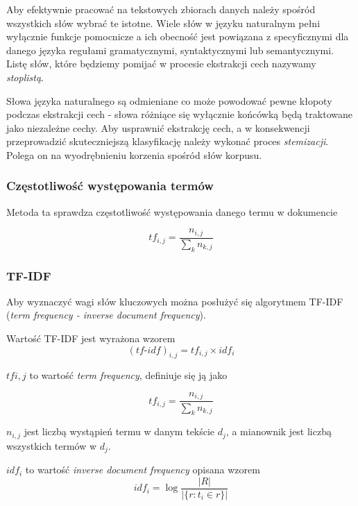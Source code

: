 \documentclass{classrep}
\begin{document}
Aby efektywnie pracować na tekstowych zbiorach danych należy spośród wszystkich słów wybrać te
istotne. Wiele słów w języku naturalnym pełni wyłącznie funkcje pomocnicze a ich obecność
jest powiązana z specyficznymi dla danego języka regułami gramatycznymi, syntaktycznymi
lub semantycznymi. Listę słów, które będziemy pomijać w procesie ekstrakcji cech
nazywamy \textit{stoplistą}.


Słowa języka naturalnego są odmieniane co może powodować pewne kłopoty podczas ekstrakcji
cech - słowa różniące się wyłącznie końcówką będą traktowane jako niezależne cechy. Aby
usprawnić ekstrakcję cech, a w konsekwencji przeprowadzić skuteczniejszą klasyfikację
należy wykonać proces \textit{stemizacji}. Polega on na wyodrębnieniu korzenia spośród
słów korpusu.

\subsubsection{Częstotliwość występowania termów}
Metoda ta sprawdza częstotliwość występowania danego termu w dokumencie

\begin{equation}
  tf_{i,j} = \frac{n_{i,j}}{\sum_k n_{k,j}}
\end{equation}

\subsubsection{TF-IDF}
Aby wyznaczyć wagi słów kluczowych można posłużyć się algorytmem TF-IDF (\textit{term
frequency - inverse document frequency}).

Wartość TF-IDF jest wyrażona wzorem
\begin{equation}
  (tf\mbox{-}idf)_{i,j} = tf_{i,j} \times idf_{i}
\end{equation}

$ tf{i,j} $ to wartość \textit{term frequency}, definiuje się ją jako

\begin{equation}
  tf_{i,j} = \frac{n_{i,j}}{\sum_k n_{k,j}}
\end{equation}

$ n_{i, j} $ jest liczbą wystąpień termu w danym tekście $ d_{j} $, a mianownik jest
liczbą wszystkich termów w $ d_{j} $.

$ idf_{i} $ to wartość \textit{inverse document frequency} opisana wzorem
\begin{equation}
  idf_{i} = \log \frac{|R|}{|\{r: t_i \in r\}|}
\end{equation}
\end{document}
